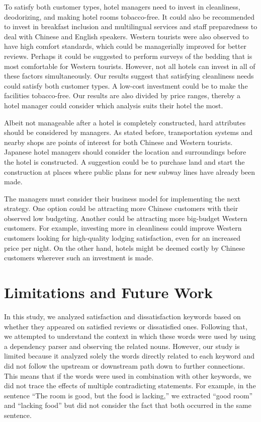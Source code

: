 \documentclass[smallextended,natbib]{svjour3}       %
\begin{document}
    To satisfy both customer types, hotel managers need to invest in cleanliness, deodorizing, and making hotel rooms tobacco-free. It could also be recommended to invest in breakfast inclusion and multilingual services and staff preparedness to deal with Chinese and English speakers. Western tourists were also observed to have high comfort standards, which could be managerially improved for better reviews. Perhaps it could be suggested to perform surveys of the bedding that is most comfortable for Western tourists. However, not all hotels can invest in all of these factors simultaneously. Our results suggest that satisfying cleanliness needs could satisfy both customer types. A low-cost investment could be to make the facilities tobacco-free. Our results are also divided by price ranges, thereby a hotel manager could consider which analysis suits their hotel the most.

    Albeit not manageable after a hotel is completely constructed, hard attributes should be considered by managers. As stated before, transportation systems and nearby shops are points of interest for both Chinese and Western tourists. Japanese hotel managers should consider the location and surroundings before the hotel is constructed. A suggestion could be to purchase land and start the construction at places where public plans for new subway lines have already been made. 

    The managers must consider their business model for implementing the next strategy. One option could be attracting more Chinese customers with their observed low budgeting. Another could be attracting more big-budget Western customers. For example, investing more in cleanliness could improve Western customers looking for high-quality lodging satisfaction, even for an increased price per night. On the other hand, hotels might be deemed costly by Chinese customers wherever such an investment is made.

\section{Limitations and Future Work}\label{limitations}

  In this study, we analyzed satisfaction and dissatisfaction keywords based on whether they appeared on satisfied reviews or dissatisfied ones. Following that, we attempted to understand the context in which these words were used by using a dependency parser and observing the related nouns. However, our study is limited because it analyzed solely the words directly related to each keyword and did not follow the upstream or downstream path down to further connections. This means that if the words were used in combination with other keywords, we did not trace the effects of multiple contradicting statements. For example, in the sentence ``The room is good, but the food is lacking,'' we extracted ``good room'' and ``lacking food'' but did not consider the fact that both occurred in the same sentence.
\end{document}
